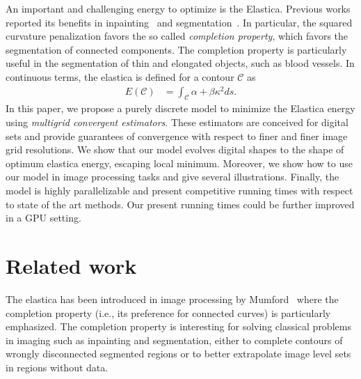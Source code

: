 \documentclass[review]{siamart220329}
\newcommand{\C}{\mathcal{C}} %
\begin{document}
An important and challenging energy to optimize is the Elastica. Previous works
reported its benefits in
inpainting~\cite{masnou98inpainting,ballester01filljoint,chan02elasticainpainting}
and
segmentation~\cite{goldluecke11totalcurvature,zhu2013image,nieuwenhuis14efficient,
antunes20}. In particular, the squared curvature penalization favors the so
called \emph{completion property}, which favors the segmentation of connected
components. The completion property is particularly useful in the segmentation
of thin and elongated objects, such as blood vessels. In continuous terms, the
elastica is defined for a contour $\C$ as
%
\begin{align*}
	E(\C) &= \int_{\C}{\alpha + \beta \kappa^2 ds}.
\end{align*}
%
In this paper, we propose a purely discrete model to minimize the Elastica
energy using \emph{multigrid convergent estimators}. These estimators are
conceived for digital sets and provide guarantees of convergence with respect
to finer and finer image grid resolutions. We show that our model evolves
digital shapes to the shape of optimum elastica energy, escaping local minimum.
Moreover, we show how to use our model in image processing tasks and give
several illustrations. Finally, the model is highly parallelizable and present
competitive running times with respect to state of the art methods. Our present
running times could be further improved in a GPU setting.
%
%
\section{Related work}

The elastica has been introduced in image processing by
Mumford~\cite{mumford1994elastica} where the completion property (i.e., its
preference for connected curves) is particularly emphasized. The completion
property is interesting for solving classical problems in imaging such as
inpainting and segmentation, either to complete contours of wrongly disconnected
segmented regions or to better extrapolate image level sets in regions without
data. 
\end{document}
